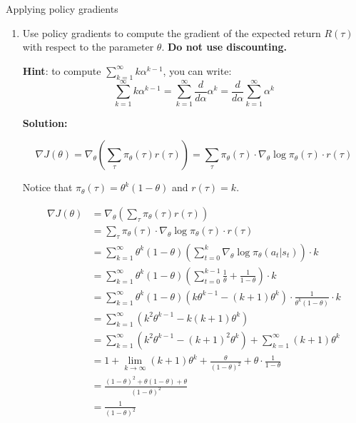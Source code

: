 \documentclass{article}
\begin{document}
\begin{enumerate}
 Applying policy gradients
\begin{enumerate}
    \item Use policy gradients to compute the gradient of the expected return $R(\tau)$ with respect to the parameter $\theta$. \textbf{Do not use discounting.}

    \textbf{Hint}: to compute $\sum_{k=1}^\infty k\alpha^{k-1}$, you can write:
    \[\sum_{k=1}^\infty k\alpha^{k-1} = \sum_{k=1}^\infty \frac{d}{d\alpha}\alpha^k = \frac{d}{d\alpha}\sum_{k=1}^\infty\alpha^k\]

    \textbf{Solution:}

        $$
        \nabla J(\theta) = \nabla_{\theta} \left( \sum_{\tau} \pi_{\theta}(\tau) r(\tau) \right) = \sum_{\tau} \pi_{\theta}(\tau) \cdot \nabla_{\theta} \log \pi_{\theta}(\tau) \cdot r(\tau)
        $$

        Notice that $\pi_{\theta}(\tau) = \theta^k (1 - \theta)$ and $r(\tau) = k$.

        $$
        \begin{aligned}
        \nabla J(\theta) 
        &= \nabla_{\theta} \left( \sum_{\tau} \pi_{\theta}(\tau) r(\tau) \right) \\
        &= \sum_{\tau} \pi_{\theta}(\tau) \cdot \nabla_{\theta} \log \pi_{\theta}(\tau) \cdot r(\tau) \\
        &= \sum_{k=1}^{\infty} \theta^k (1 - \theta) \left( \sum_{t=0}^{k} \nabla_{\theta} \log \pi_{\theta}(a_t | s_t) \right) \cdot k \\
        &= \sum_{k=1}^{\infty} \theta^k (1 - \theta) \left( \sum_{t=0}^{k-1} \frac{1}{\theta} + \frac{1}{1 - \theta} \right) \cdot k \\
        &= \sum_{k=1}^{\infty} \theta^k (1 - \theta) \left( k \theta^{k-1} - (k+1) \theta^k \right) \cdot \frac{1}{\theta^k (1 - \theta)} \cdot k \\
        &= \sum_{k=1}^{\infty} \left( k^2 \theta^{k-1} - k(k+1) \theta^k \right) \\
        &= \sum_{k=1}^{\infty} \left( k^2 \theta^{k-1} - (k+1)^2 \theta^k \right) + \sum_{k=1}^{\infty} (k+1) \theta^k \\
        &= 1 + \lim_{k \to \infty} (k+1) \theta^k + \frac{\theta}{(1-\theta)^2} + \theta \cdot \frac{1}{1-\theta} \\
        &= \frac{(1-\theta)^2 + \theta (1-\theta) + \theta}{(1-\theta)^2} \\
        &= \frac{1}{(1-\theta)^2}
        \end{aligned}
        $$
        


\end{enumerate}
\end{enumerate}
\end{document}
